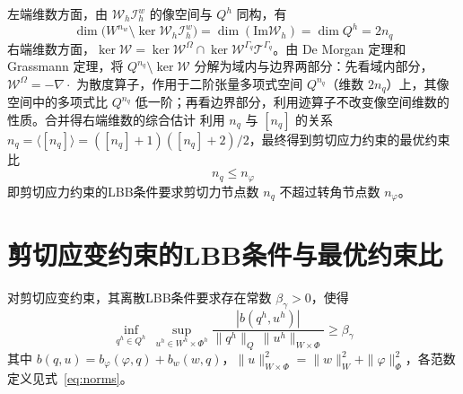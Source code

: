\documentclass[internationalmaster]{hquThesis}
\begin{document}
左端维数方面，由 $\mathcal W_h \mathcal I_h^{w}$ 的像空间与 $Q^{h}$ 同构，有
\begin{equation}
    \dim\bigl(W^{n_w}\setminus\ker\mathcal W_h \mathcal I_h^{w}\bigr)
    = \dim(\mathrm{Im}\mathcal W_h) = \dim Q^{h} = 2n_q
    \label{eq:lhs-dim-stress}
\end{equation}
右端维数方面，$\ker\mathcal W=\ker\mathcal W^\Omega\cap\ker\mathcal W^{\Gamma_q}\mathcal T^{\Gamma_q}$。由 De Morgan 定理和 Grassmann 定理，将 $Q^{n_q}\setminus\ker\mathcal W$ 分解为域内与边界两部分：先看域内部分，$\mathcal W^\Omega=-\nabla\cdot$ 为散度算子，作用于二阶张量多项式空间 $Q^{n_q}$（维数 $2n_q$）上，其像空间中的多项式比 $Q^{n_q}$ 低一阶；再看边界部分，利用迹算子不改变像空间维数的性质。合并得右端维数的综合估计
利用 $n_q$ 与 $[n_q]$ 的关系 $n_q=\langle[n_q]\rangle=([n_q]+1)([n_q]+2)/2$，最终得到剪切应力约束的最优约束比
\begin{equation}
    n_q \leq n_\varphi
    \label{eq:ratio-stress}
\end{equation}
即剪切应力约束的LBB条件要求剪切力节点数 $n_q$ 不超过转角节点数 $n_\varphi$。

\section{剪切应变约束的LBB条件与最优约束比}

对剪切应变约束，其离散LBB条件要求存在常数 $\beta_\gamma>0$，使得
\begin{equation}
    \inf_{q^{h}\in Q^{h}}\ \sup_{u^{h}\in W^{h}\times\Phi^{h}}
    \frac{|b(q^{h},u^{h})|}{\| q^{h}\|_Q\,\| u^{h}\|_{W\times\Phi}} \geq \beta_\gamma
    \label{eq:lbb-betagamma}
\end{equation}
其中 $b(q,u)=b_\varphi(\varphi,q)+b_w(w,q)$，$\| u\|_{W\times\Phi}^{2}=\| w\|_W^{2}+\|\varphi\|_\Phi^{2}$，各范数定义见式~\eqref{eq:norms}。
\end{document}
